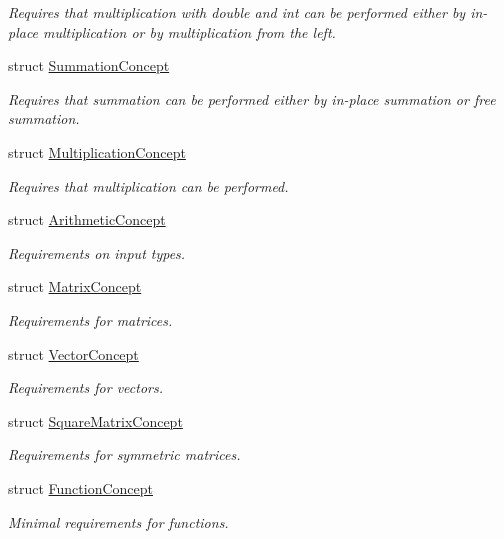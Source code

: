 \begin{DoxyCompactItemize}
\begin{DoxyCompactList}\small\item\em Requires that multiplication with double and int can be performed either by in-\/place multiplication or by multiplication from the left. \end{DoxyCompactList}\item 
struct \hyperlink{structFunG_1_1Concepts_1_1SummationConcept}{Summation\-Concept}
\begin{DoxyCompactList}\small\item\em Requires that summation can be performed either by in-\/place summation or free summation. \end{DoxyCompactList}\item 
struct \hyperlink{structFunG_1_1Concepts_1_1MultiplicationConcept}{Multiplication\-Concept}
\begin{DoxyCompactList}\small\item\em Requires that multiplication can be performed. \end{DoxyCompactList}\item 
struct \hyperlink{structFunG_1_1Concepts_1_1ArithmeticConcept}{Arithmetic\-Concept}
\begin{DoxyCompactList}\small\item\em Requirements on input types. \end{DoxyCompactList}\item 
struct \hyperlink{structFunG_1_1Concepts_1_1MatrixConcept}{Matrix\-Concept}
\begin{DoxyCompactList}\small\item\em Requirements for matrices. \end{DoxyCompactList}\item 
struct \hyperlink{structFunG_1_1Concepts_1_1VectorConcept}{Vector\-Concept}
\begin{DoxyCompactList}\small\item\em Requirements for vectors. \end{DoxyCompactList}\item 
struct \hyperlink{structFunG_1_1Concepts_1_1SquareMatrixConcept}{Square\-Matrix\-Concept}
\begin{DoxyCompactList}\small\item\em Requirements for symmetric matrices. \end{DoxyCompactList}\item 
struct \hyperlink{structFunG_1_1Concepts_1_1FunctionConcept}{Function\-Concept}
\begin{DoxyCompactList}\small\item\em Minimal requirements for functions. \end{DoxyCompactList}\end{DoxyCompactItemize}
